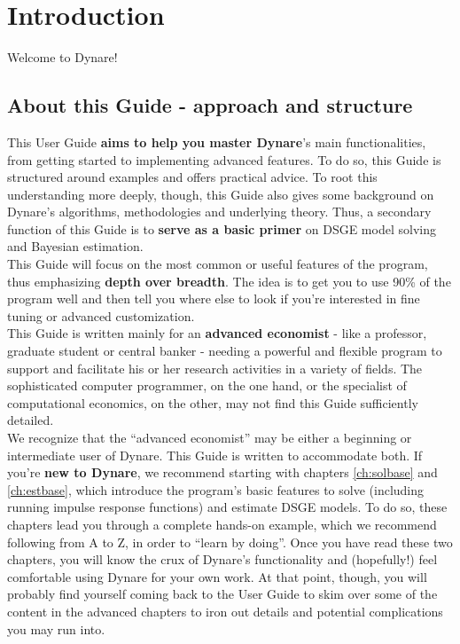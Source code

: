 \chapter{Introduction} \label{ch:intro}

Welcome to Dynare! \\

\section{About this Guide - approach and structure}
This User Guide \textbf{aims to help you master Dynare}'s main functionalities, from getting started to implementing advanced features. To do so, this Guide is structured around examples and offers practical advice. To root this understanding more deeply, though, this Guide also gives some background on Dynare's algorithms, methodologies and underlying theory. Thus, a secondary function of this Guide is to \textbf{serve as a basic primer} on DSGE model solving and Bayesian estimation. \\

This Guide will focus on the most common or useful features of the program, thus emphasizing \textbf{depth over breadth}. The idea is to get you to use 90\% of the program well and then tell you where else to look if you're interested in fine tuning or advanced customization.\\

This Guide is written mainly for an \textbf{advanced economist} - like a professor, graduate student or central banker - needing a powerful and flexible program to support and facilitate his or her research activities in a variety of fields. The sophisticated computer programmer, on the one hand, or the specialist of computational economics, on the other, may not find this Guide sufficiently detailed. \\

We recognize that the ``advanced economist'' may be either a beginning or intermediate user of Dynare. This Guide is written to accommodate both. If you're \textbf{new to Dynare}, we recommend starting with chapters \ref{ch:solbase} and \ref{ch:estbase}, which introduce the program's basic features to solve (including running impulse response functions) and estimate DSGE models. To do so, these chapters lead you through a complete hands-on example, which we recommend following from A to Z, in order to ``learn by doing''. Once you have read these two chapters, you will know the crux of Dynare's functionality and (hopefully!) feel comfortable using Dynare for your own work. At that point, though, you will probably find yourself coming back to the User Guide to skim over some of the content in the advanced chapters to iron out details and potential complications you may run into.\\

